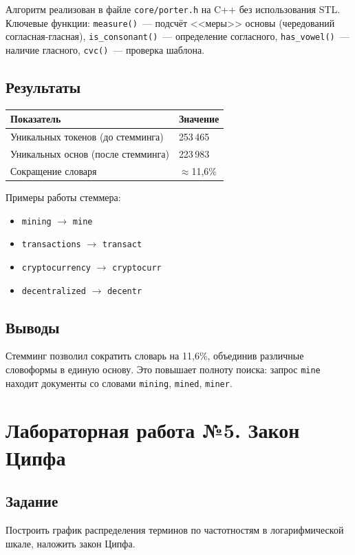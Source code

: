\documentclass[12pt,a4paper]{article}
\begin{document}
Алгоритм реализован в файле \texttt{core/porter.h} на C++ без использования STL.
Ключевые функции: \texttt{measure()}~--- подсчёт <<меры>> основы (чередований
согласная-гласная), \texttt{is\_consonant()}~--- определение согласного,
\texttt{has\_vowel()}~--- наличие гласного, \texttt{cvc()}~--- проверка шаблона.

\subsection{Результаты}
\begin{table}[H]
\centering
\begin{tabular}{ll}
\toprule
\textbf{Показатель} & \textbf{Значение} \\
\midrule
Уникальных токенов (до стемминга) & 253\,465 \\
Уникальных основ (после стемминга) & 223\,983 \\
Сокращение словаря & $\approx$11{,}6\% \\
\bottomrule
\end{tabular}
\end{table}

Примеры работы стеммера:
\begin{itemize}
    \item \texttt{mining} $\rightarrow$ \texttt{mine}
    \item \texttt{transactions} $\rightarrow$ \texttt{transact}
    \item \texttt{cryptocurrency} $\rightarrow$ \texttt{cryptocurr}
    \item \texttt{decentralized} $\rightarrow$ \texttt{decentr}
\end{itemize}

\subsection{Выводы}
Стемминг позволил сократить словарь на 11{,}6\%, объединив различные
словоформы в единую основу. Это повышает полноту поиска: запрос \texttt{mine}
находит документы со словами \texttt{mining}, \texttt{mined}, \texttt{miner}.

\section{Лабораторная работа №5. Закон Ципфа}

\subsection{Задание}
Построить график распределения терминов по частотностям в логарифмической
шкале, наложить закон Ципфа.
\end{document}
